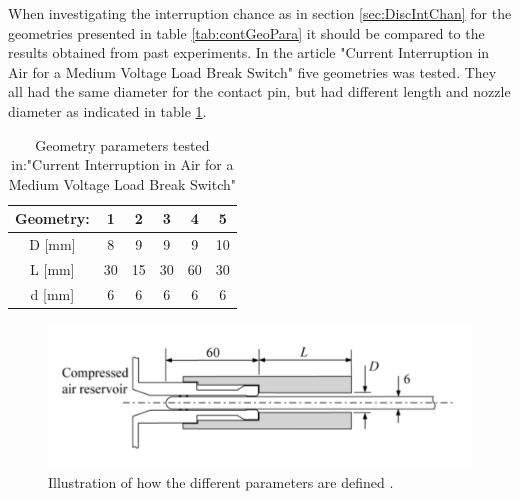 \documentclass[10pt,a4paper]{article}
\begin{document}
\makeatletter 
\renewcommand{\thetable}{B.\@arabic\c@table}
\makeatother

When investigating the interruption chance as in section \ref{sec:DiscIntChan} for the geometries presented in table \ref{tab:contGeoPara} it should be compared to the results obtained from past experiments. In the article "Current Interruption in Air for a Medium Voltage Load Break Switch" \cite{bib:CIAMVLBS} five geometries was tested. They all had the same diameter for the contact pin, but had different length and nozzle diameter as indicated in table \ref{tab:contactParaMVALBS}.
\begin{table} [H]
\center
\caption{Geometry parameters tested in:"Current Interruption in Air for a Medium Voltage Load Break Switch"}
\begin{tabular}{|c|c|c|c|c|c|}
\hline 
Geometry: & 1 & 2 & 3 & 4 & 5 \\ 
\hline 
D [mm] & 8 & 9 & 9 & 9 & 10 \\ 
\hline 
L [mm] & 30 & 15 & 30 & 60 & 30 \\ 
\hline 
d [mm] & 6 & 6 & 6 & 6 & 6 \\ 
\hline 
\end{tabular}
\label{tab:contactParaMVALBS}
\end{table}

\begin{figure}[H]
\centering
	\includegraphics[scale=0.6]{Bilder/Discussion/paraDefine.png}
	\caption{Illustration of how the different parameters are defined  \cite{bib:CIAMVLBS}.}
	\label{fig:paraDefMVALBS}
\end{figure}
\end{document}
